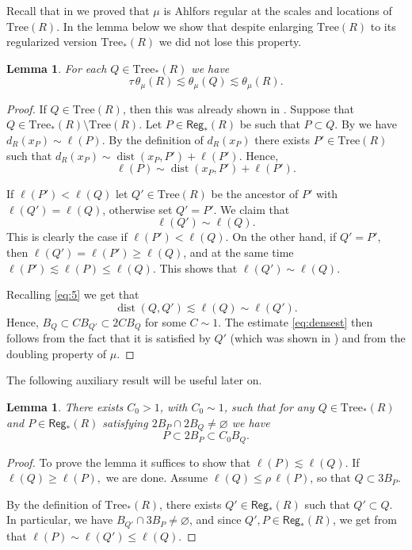 \documentclass[11pt,reqno]{amsart}
\newcommand{\Tr}{\mathrm{Tree}}
\def\dist{\mathop\mathrm{dist}} 						%
\newtheorem{lemma}[theorem]{Lemma}
\theoremstyle{definition}
\theoremstyle{remark}
\numberwithin{equation}{section}
\newcommand{\Reg}{\mathsf{Reg}_*}
\theoremstyle{theorem}
\theoremstyle{definition}
\theoremstyle{remark}
\numberwithin{equation}{section}
\begin{document}
	Recall that in  we proved that $\mu$ is Ahlfors regular at the scales and locations of $\Tr(R)$. In the lemma below we show that despite enlarging $\Tr(R)$ to its regularized version $\Tr_*(R)$ we did not lose this property.
	\begin{lemma}\label{lem:muADR2}
		For each $Q\in\Tr_*(R)$ we have
		\begin{equation}\label{eq:densest}
		\tau\,\theta_\mu(R)\lesssim \theta_\mu(Q)\lesssim \theta_\mu(R).
		\end{equation}
	\end{lemma}
	\begin{proof}
		If $Q\in\Tr(R)$, then this was already shown in . Suppose that $Q\in\Tr_*(R)\setminus\Tr(R)$. Let $P\in\Reg(R)$ be such that $P\subset Q$. By  we have $d_R(x_P)\sim\ell(P)$. By the definition of $d_R(x_P)$ there exists $P'\in\Tr(R)$ such that $d_R(x_P)\sim \dist(x_P,P')+\ell(P')$. Hence,
		\begin{equation}\label{eq:5}
		\ell(P)\sim \dist(x_P,P')+\ell(P').
		\end{equation} 
		
		If $\ell(P')<\ell(Q)$ let $Q'\in\Tr(R)$ be the ancestor of $P'$ with $\ell(Q')=\ell(Q)$, otherwise set $Q'=P'$. We claim that
		\begin{equation*}
		\ell(Q')\sim\ell(Q).
		\end{equation*}
		This is clearly the case if $\ell(P')<\ell(Q)$. On the other hand, if $Q'=P'$, then $\ell(Q')=\ell(P')\ge \ell(Q)$, and at the same time $\ell(P')\lesssim \ell(P)\le\ell(Q)$. This shows that $\ell(Q')\sim\ell(Q)$.
		
		Recalling \eqref{eq:5} we get that
		\begin{equation*}
		\dist(Q,Q')\lesssim\ell(Q)\sim\ell(Q').
		\end{equation*}
		Hence, $B_Q\subset CB_{Q'}\subset 2C B_{Q}$ for some $C\sim 1$. The estimate \eqref{eq:densest} then follows from the fact that it is satisfied by $Q'$ (which was shown in ) and from the doubling property of $\mu$.
		
		
	\end{proof}
	The following auxiliary result will be useful later on.
	\begin{lemma}\label{lem:PcapQ}
		There exists $C_0>1$, with $C_0\sim 1$, such that for any $Q\in\Tr_*(R)$ and $P\in\Reg(R)$ satisfying $2B_P\cap 2B_Q\neq\varnothing$ we have 
		\begin{equation*}
		P\subset 2B_P\subset C_0B_Q.
		\end{equation*}
	\end{lemma}
	\begin{proof}
		To prove the lemma it suffices to show that $\ell(P)\lesssim\ell(Q)$. If $\ell(Q)\ge\ell(P),$ we are done. Assume $\ell(Q)\le \rho\, \ell(P)$, so that $Q\subset 3B_P$. 
		
		By the definition of $\Tr_*(R)$, there exists $Q'\in\Reg(R)$ such that $Q'\subset Q$. In particular, we have $B_{Q'}\cap 3B_P\neq\varnothing$, and since $Q', P\in\Reg(R)$, we get from  that $\ell(P)\sim\ell(Q')\le \ell(Q)$.
	\end{proof}
	
\end{document}
